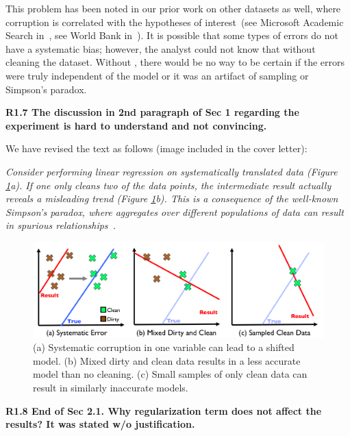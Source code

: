 This problem has been noted in our prior work on other datasets as well, where corruption is correlated with the hypotheses of interest~(see Microsoft Academic Search in~\cite{wang1999sample}, see World Bank in~\cite{activecleanarxiv}). It is possible that some types of errors do not have a systematic bias; however, the analyst could not know that without cleaning the dataset.
Without \sys, there would be no way to be certain if the errors were truly independent of the model or it was an artifact of sampling or Simpson's paradox.

\vspace{0.5em}

\noindent\textbf{R1.7 The discussion in 2nd paragraph of Sec 1 regarding the experiment is hard to understand and not convincing.}

\noindent We have revised the text as follows (image included in the cover letter):

\emph{Consider performing linear regression on systematically translated data (Figure \ref{update-arch-coverletter}a).
If one only cleans two of the data points, the intermediate result actually reveals a misleading trend (Figure \ref{update-arch-coverletter}b).
This is a consequence of the well-known Simpson's paradox, where aggregates over different populations of data can result in spurious relationships~\cite{simpson1951interpretation}.}

\begin{figure}[ht!]
\centering
 \includegraphics[width=\columnwidth]{figs/update-arch.png}
 \caption{(a) Systematic corruption in one variable can lead to a shifted model. 
 (b) Mixed dirty and clean data results in a less accurate model than no cleaning.
(c) Small samples of only clean data can result in similarly inaccurate models. \label{update-arch-coverletter}}
\end{figure}

\vspace{0.5em}

\noindent\textbf{R1.8 End of Sec 2.1. Why regularization term does not affect the results? It was stated w/o justification.}

